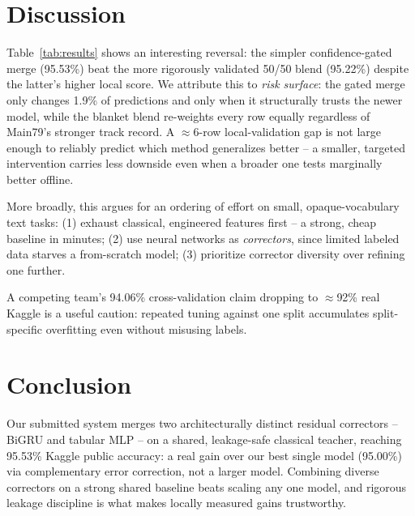 \documentclass[10pt,twocolumn]{article}
\begin{document}
\enlargethispage{2\baselineskip}
\section{Discussion}
Table~\ref{tab:results} shows an interesting reversal: the simpler confidence-gated merge (95.53\%) beat the more rigorously validated 50/50 blend (95.22\%) despite the latter's higher local score. We attribute this to \emph{risk surface}: the gated merge only changes 1.9\% of predictions and only when it structurally trusts the newer model, while the blanket blend re-weights every row equally regardless of Main79's stronger track record. A $\approx$6-row local-validation gap is not large enough to reliably predict which method generalizes better -- a smaller, targeted intervention carries less downside even when a broader one tests marginally better offline.

More broadly, this argues for an ordering of effort on small, opaque-vocabulary text tasks: (1) exhaust classical, engineered features first -- a strong, cheap baseline in minutes; (2) use neural networks as \emph{correctors}, since limited labeled data starves a from-scratch model; (3) prioritize corrector diversity over refining one further.

A competing team's 94.06\% cross-validation claim dropping to $\approx$92\% real Kaggle is a useful caution: repeated tuning against one split accumulates split-specific overfitting even without misusing labels.

\vspace{-4pt}
\section{Conclusion}
Our submitted system merges two architecturally distinct residual correctors -- BiGRU and tabular MLP -- on a shared, leakage-safe classical teacher, reaching 95.53\% Kaggle public accuracy: a real gain over our best single model (95.00\%) via complementary error correction, not a larger model. Combining diverse correctors on a strong shared baseline beats scaling any one model, and rigorous leakage discipline is what makes locally measured gains trustworthy.
\end{document}
